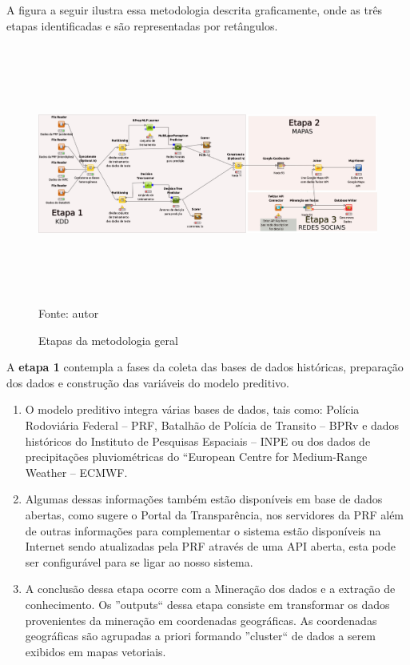A figura a seguir ilustra essa metodologia descrita graficamente, onde as três etapas identificadas e são representadas por retângulos.

\pagebreak

\begin{figure}[ht]
\centering
\caption{Etapas da metodologia geral}
\includegraphics[width=170mm, height=85mm]{Figuras/Cronograma/metodologia.png}\\
\tiny Fonte: autor
\end{figure}

A \textbf{etapa 1} contempla a fases da coleta das bases de dados históricas, preparação dos dados e construção das variáveis do modelo preditivo.
  \begin{enumerate}
    \item O modelo preditivo integra várias bases de dados, tais como: Polícia Rodoviária Federal -- PRF, Batalhão de Polícia de Transito -- BPRv e dados históricos 
	   do Instituto de Pesquisas Espaciais -- INPE ou dos dados de precipitações pluviométricas do ``European Centre for Medium-Range Weather -- ECMWF.
 
    \item Algumas dessas informações também estão disponíveis em base de dados abertas, como sugere o Portal da Transparência, nos servidores da PRF além de outras
	  informações para complementar o sistema estão disponíveis na Internet sendo atualizadas pela PRF através de uma API aberta, esta pode 
	  ser configurável para se ligar ao nosso sistema.
    \item A conclusão dessa etapa ocorre com a Mineração dos dados e a extração de conhecimento.
	  Os ''outputs`` dessa etapa consiste em transformar os dados provenientes da mineração em coordenadas geográficas. 
	  As coordenadas geográficas são agrupadas a priori formando ''cluster`` de dados a serem exibidos em mapas vetoriais.\\
\end{enumerate}
  
